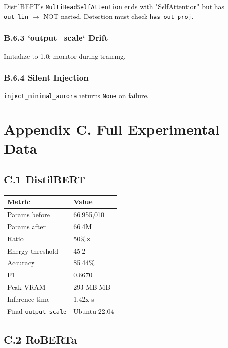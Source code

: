 DistilBERT's \texttt{MultiHeadSelfAttention} ends with "SelfAttention" but has 
\texttt{out\_lin} $\to$ NOT nested. Detection must check \texttt{has\_out\_proj}.

\subsubsection{B.6.3 `output\_scale` Drift}

Initialize to 1.0; monitor during training.

\subsubsection{B.6.4 Silent Injection}

\texttt{inject\_minimal\_aurora} returns \texttt{None} on failure.



\section{Appendix C. Full Experimental Data}

\subsection{C.1 DistilBERT}

\begin{table}[H]
\centering
\small
\begin{tabular}{ll}
\toprule
\textbf{Metric} & \textbf{Value} \\
\midrule
Params before & 66,955,010 \\
Params after & 66.4M \\
Ratio & 50\%$\times$ \\
Energy threshold & 45.2 \\
Accuracy & 85.44\% \\
F1 & 0.8670 \\
Peak VRAM & 293 MB MB \\
Inference time & 1.42x s \\
Final \texttt{output\_scale} & Ubuntu 22.04 \\
\bottomrule
\end{tabular}
\end{table}

\subsection{C.2 RoBERTa}

